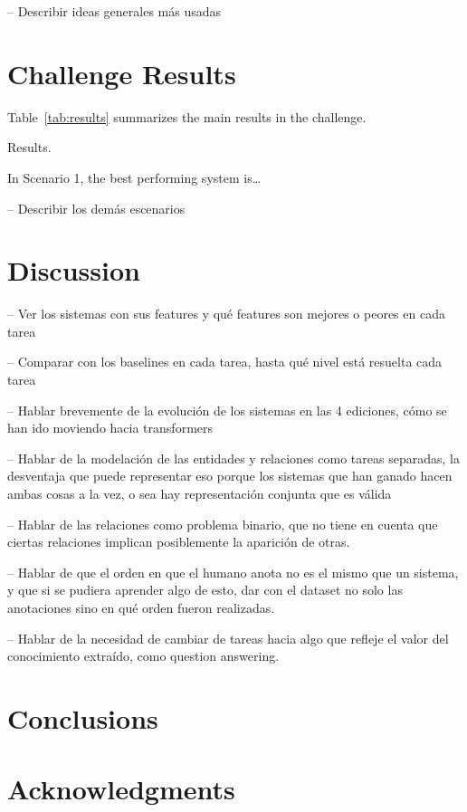 \documentclass[a4paper,11pt,twocolumn,twoside]{article}
\begin{document}
-- Describir ideas generales más usadas

\section{Challenge Results}\label{sec:results}

Table~\ref{tab:results} summarizes the main results in the challenge.

\begin{table}
  \caption{Results.\label{tab:results}}
\end{table}

In Scenario 1, the best performing system is\dots

-- Describir los demás escenarios

\section{Discussion}\label{sec:discussion}

-- Ver los sistemas con sus features y qué features son mejores o peores en cada tarea

-- Comparar con los baselines en cada tarea, hasta qué nivel está resuelta cada tarea

-- Hablar brevemente de la evolución de los sistemas en las 4 ediciones,
cómo se han ido moviendo hacia transformers

-- Hablar de la modelación de las entidades y relaciones como tareas separadas,
la desventaja que puede representar eso porque los sistemas que han ganado hacen
ambas cosas a la vez, o sea hay representación conjunta que es válida

-- Hablar de las relaciones como problema binario, que no tiene en cuenta que ciertas
relaciones implican posiblemente la aparición de otras.

-- Hablar de que el orden en que el humano anota no es el mismo que un sistema,
y que si se pudiera aprender algo de esto, dar con el dataset no solo las anotaciones
sino en qué orden fueron realizadas.

-- Hablar de la necesidad de cambiar de tareas hacia algo que refleje el valor
del conocimiento extraído, como question answering.

\section{Conclusions}\label{sec:conclusions}

\section*{Acknowledgments}



\end{document}
